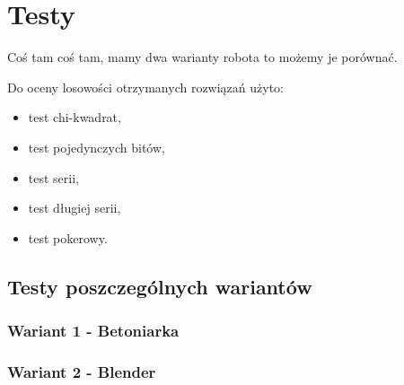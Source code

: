 \chapter{Testy}

Coś tam coś tam, mamy dwa warianty robota to możemy je porównać.

Do oceny losowości otrzymanych rozwiązań użyto:
\begin{itemize}
    \item test chi-kwadrat,
    \item test pojedynczych bitów,
    \item test serii,
    \item test długiej serii,
    \item test pokerowy.
\end{itemize}

\section{Testy poszczególnych wariantów}
\subsection{Wariant 1 - \glqq Betoniarka\grqq}
\subsection{Wariant 2 - \glqq Blender\grqq}

